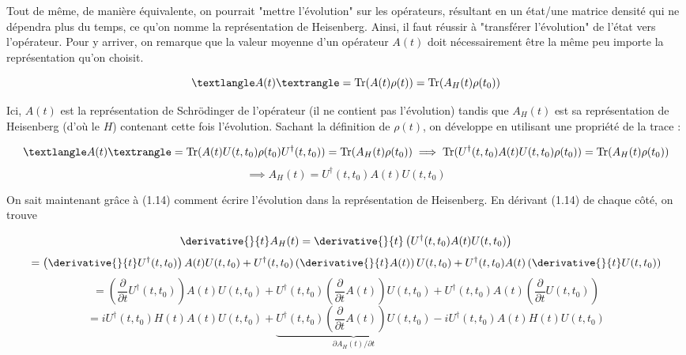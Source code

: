 Tout de même, de manière équivalente, on pourrait "mettre l'évolution" sur les opérateurs, résultant en un état/une matrice densité qui ne dépendra plus du temps, ce qu'on nomme la représentation de Heisenberg. Ainsi, il faut réussir à "transférer l'évolution" de l'état vers l'opérateur. Pour y arriver, on remarque que la valeur moyenne d'un opérateur $A(t)$ doit nécessairement être la même peu importe la représentation qu'on choisit.

\begin{equation*}
    \textlangle A(t)\textrangle = \text{Tr}(A(t)\rho(t)) = \text{Tr}(A_H(t)\rho(t_0)) 
\end{equation*}

Ici, $A(t)$ est la représentation de Schrödinger de l'opérateur (il ne contient pas l'évolution) tandis que $A_H(t)$ est sa représentation de Heisenberg (d'où le $H$) contenant cette fois l'évolution. Sachant la définition de $\rho(t)$, on développe en utilisant une propriété de la trace :

\begin{equation*}
    \textlangle A(t)\textrangle = \text{Tr}(A(t)U(t,t_0)\rho(t_0)U^\dagger(t,t_0)) = \text{Tr}(A_H(t)\rho(t_0)) \implies \text{Tr}(U^\dagger(t,t_0)A(t)U(t,t_0)\rho(t_0)) = \text{Tr}(A_H(t)\rho(t_0)) 
\end{equation*}
\begin{equation}
    \implies A_H(t) = U^\dagger(t,t_0)A(t)U(t,t_0)
\end{equation}

On sait maintenant grâce à (1.14) comment écrire l'évolution dans la représentation de Heisenberg. En dérivant (1.14) de chaque côté, on trouve 

\begin{equation*}
    \derivative{}{t}A_H(t) = \derivative{}{t}\left(U^\dagger(t,t_0)A(t)U(t,t_0)\right)
\end{equation*}
\begin{equation*}
    = \left(\derivative{}{t}U^\dagger(t,t_0)\right)A(t)U(t,t_0) + U^\dagger(t,t_0)\left(\derivative{}{t}A(t)\right)U(t,t_0) + U^\dagger(t,t_0)A(t)\left(\derivative{}{t}U(t,t_0)\right)
\end{equation*}
\begin{equation*}
    = \left(\frac{\partial}{\partial t}U^\dagger(t,t_0)\right)A(t)U(t,t_0) + U^\dagger(t,t_0)\left(\frac{\partial}{\partial t}A(t)\right)U(t,t_0) + U^\dagger(t,t_0)A(t)\left(\frac{\partial}{\partial t}U(t,t_0)\right)
\end{equation*}
\begin{equation*}
    = iU^\dagger(t,t_0)H(t)A(t)U(t,t_0) + \underbrace{U^\dagger(t,t_0)\left(\frac{\partial}{\partial t}A(t)\right)U(t,t_0)}_\text{$\partial A_H(t)/\partial t$} - iU^\dagger(t,t_0)A(t)H(t)U(t,t_0)
\end{equation*}

